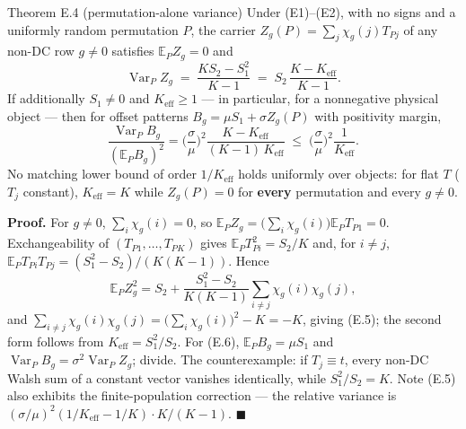 \begin{namedthm}{Theorem E.4 (permutation-alone variance)}
Under (E1)--(E2), with no signs and a uniformly random permutation $P$, the carrier $Z_g(P)=\sum_j\chi_g(j)T_{Pj}$ of any non-DC row $g\neq0$ satisfies $\mathbb{E}_PZ_g=0$ and
\begin{equation}
\operatorname{Var}_PZ_g\;=\;\frac{KS_2-S_1^2}{K-1}\;=\;S_2\,\frac{K-K_{\mathrm{eff}}}{K-1}. \tag{E.5}
\end{equation}
If additionally $S_1\ne0$ and $K_{\mathrm{eff}}\ge1$ --- in particular, for a nonnegative physical object --- then for offset patterns $B_g=\mu S_1+\sigma Z_g(P)$ with positivity margin,
\begin{equation}
\frac{\operatorname{Var}_PB_g}{(\mathbb{E}_PB_g)^2}=\Big(\frac{\sigma}{\mu}\Big)^2\frac{K-K_{\mathrm{eff}}}{(K-1)\,K_{\mathrm{eff}}}\;\le\;\Big(\frac{\sigma}{\mu}\Big)^2\frac{1}{K_{\mathrm{eff}}}. \tag{E.6}
\end{equation}
No matching lower bound of order $1/K_{\mathrm{eff}}$ holds uniformly over objects: for flat $T$ ($T_j$ constant), $K_{\mathrm{eff}}=K$ while $Z_g(P)=0$ for \textbf{every} permutation and every $g\neq0$.
\end{namedthm}

\noindent\textbf{Proof.} For $g\neq0$, $\sum_i\chi_g(i)=0$, so $\mathbb{E}_PZ_g=\big(\sum_i\chi_g(i)\big)\mathbb{E}_PT_{P1}=0$. Exchangeability of $(T_{P1},\dots,T_{PK})$ gives $\mathbb{E}_PT_{Pi}^2=S_2/K$ and, for $i\neq j$, $\mathbb{E}_PT_{Pi}T_{Pj}=(S_1^2-S_2)/(K(K-1))$. Hence
\[
\mathbb{E}_PZ_g^2=S_2+\frac{S_1^2-S_2}{K(K-1)}\sum_{i\neq j}\chi_g(i)\chi_g(j),
\]
and $\sum_{i\neq j}\chi_g(i)\chi_g(j)=\big(\sum_i\chi_g(i)\big)^2-K=-K$, giving (E.5); the second form follows from $K_{\mathrm{eff}}=S_1^2/S_2$. For (E.6), $\mathbb{E}_PB_g=\mu S_1$ and $\operatorname{Var}_PB_g=\sigma^2\operatorname{Var}_PZ_g$; divide. The counterexample: if $T_j\equiv t$, every non-DC Walsh sum of a constant vector vanishes identically, while $S_1^2/S_2=K$. Note (E.5) also exhibits the finite-population correction --- the relative variance is $(\sigma/\mu)^2(1/K_{\mathrm{eff}}-1/K)\cdot K/(K-1)$. \hfill$\blacksquare$


